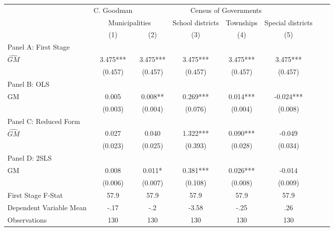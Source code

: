  \begin{tabular}{l*{7}{c}} \toprule
&\multicolumn{1}{c}{C. Goodman}&\multicolumn{4}{c}{Census of Governments}\\\cmidrule(lr){2-2}\cmidrule(lr){3-6}
&\multicolumn{2}{c}{Municipalities}&\multicolumn{1}{c}{School districts}&\multicolumn{1}{c}{Townships}&\multicolumn{1}{c}{Special districts}\\\cmidrule(lr){2-3}\cmidrule(lr){4-6}
&\multicolumn{1}{c}{(1)}&\multicolumn{1}{c}{(2)}&\multicolumn{1}{c}{(3)}&\multicolumn{1}{c}{(4)}&\multicolumn{1}{c}{(5)}\\
\cmidrule(lr){1-6}
\multicolumn{5}{l}{Panel A: First Stage}\\
\cmidrule(lr){1-6}
$\widehat{GM}$  &    3.475***&    3.475***&    3.475***&    3.475***&    3.475***\\
                &  (0.457)   &  (0.457)   &  (0.457)   &  (0.457)   &  (0.457)   \\
\cmidrule(lr){1-6}
\multicolumn{5}{l}{Panel B: OLS}\\
\cmidrule(lr){1-6}
GM              &    0.005   &    0.008** &    0.269***&    0.014***&   -0.024***\\
                &  (0.003)   &  (0.004)   &  (0.076)   &  (0.004)   &  (0.008)   \\
\cmidrule(lr){1-6}
\multicolumn{5}{l}{Panel C: Reduced Form}\\
\cmidrule(lr){1-6}
$\widehat{GM}$  &    0.027   &    0.040   &    1.322***&    0.090***&   -0.049   \\
                &  (0.023)   &  (0.025)   &  (0.393)   &  (0.028)   &  (0.034)   \\
\cmidrule(lr){1-6}
\multicolumn{5}{l}{Panel D: 2SLS}\\
\cmidrule(lr){1-6}
GM              &    0.008   &    0.011*  &    0.381***&    0.026***&   -0.014   \\
                &  (0.006)   &  (0.007)   &  (0.108)   &  (0.008)   &  (0.009)   \\
\midrule
First Stage F-Stat&     57.9   &     57.9   &     57.9   &     57.9   &     57.9   \\
Dependent Variable Mean&     -.17   &      -.2   &    -3.58   &     -.25   &      .26   \\
Observations    &      130   &      130   &      130   &      130   &      130   \\
 \bottomrule \end{tabular}
